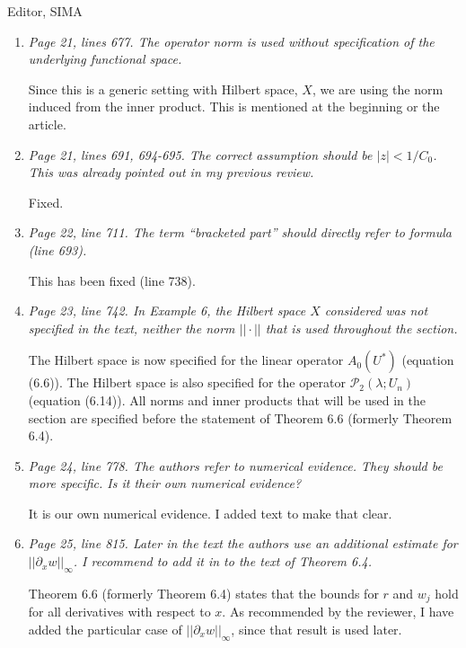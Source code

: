 \documentclass[11pt]{letter}
\begin{document}
\begin{letter}{Editor, SIMA}
\begin{enumerate}
\item \emph{Page 21, lines 677. The operator norm is used without specification of the underlying functional space.}
\vspace{4mm}

Since this is a generic setting with Hilbert space, $X$, we are using the norm induced from the inner product.  This is mentioned at the beginning or the article.

\item \emph{Page 21, lines 691, 694-695. The correct assumption should be $|z| < 1/C_0$. This was already pointed out in my previous review.}
\vspace{4mm}

Fixed.

\item \emph{Page 22, line 711. The term ``bracketed part'' should directly refer to formula (line 693).}
\vspace{4mm}

This has been fixed (line 738).

\item \emph{Page 23, line 742. In Example 6, the Hilbert space $X$ considered was not specified in the text, neither the norm $||\cdot||$ that is used throughout the section.}
\vspace{4mm}

The Hilbert space is now specified for the linear operator $A_0(U^*)$ (equation (6.6)). The Hilbert space is also specified for the operator $\mathcal{P}_2(\lambda; U_n)$ (equation (6.14)). All norms and inner products that will be used in the section are specified before the statement of Theorem 6.6 (formerly Theorem 6.4).

\item \emph{Page 24, line 778. The authors refer to numerical evidence. They should be more specific. Is it their own numerical evidence?}
\vspace{4mm}

It is our own numerical evidence. I added text to make that clear.

\item \emph{Page 25, line 815. Later in the text the authors use an additional estimate for $||\partial_x w||_\infty$. I recommend to add it in to the text of Theorem 6.4.}
\vspace{4mm}

Theorem 6.6 (formerly Theorem 6.4) states that the bounds for $r$ and $w_j$ hold for all derivatives with respect to $x$. As recommended by the reviewer, I have added the particular case of $||\partial_x w||_\infty$, since that result is used later.


\end{enumerate}
\end{letter}
\end{document}
